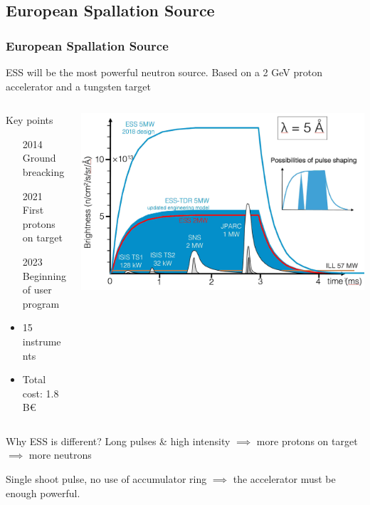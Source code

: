 \subsection{European Spallation Source}
\begin{frame}
  \frametitle{European Spallation Source}
  ESS will be the most powerful neutron source.
  Based on a 2 GeV proton accelerator and a tungsten target
  \begin{columns}
    \begin{column}{0.35\textwidth}
      \begin{block}{Key points}
        \begin{itemize}
          \item[2014] Ground breacking
          \item[2021] First protons on target
          \item[2023] Beginning of user program
          \item 15 instruments
          \item Total cost: 1.8 B€
        \end{itemize}
      \end{block}
    \end{column}
    \begin{column}{0.60\textwidth}
      \includegraphics[width=\textwidth]{01_Neutron/fig/fig000_ESS_pulse2.jpeg}
    \end{column}
  \end{columns}
  \begin{block}{Why ESS is different?}
    Long pulses \& high intensity $\implies$ more protons on target $\implies$ more neutrons

    Single shoot pulse, no use of accumulator ring $\implies$ the accelerator must be enough powerful.
  \end{block}
\end{frame}

